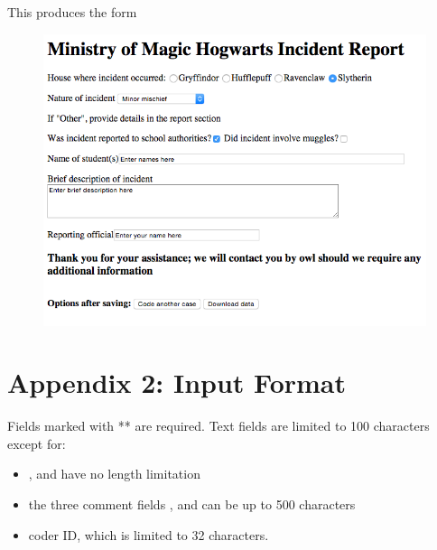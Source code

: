 \documentclass[letterpaper,10pt,english]{sphinxmanual}
\begin{document}
This produces the form
\begin{figure}[htbp]
\centering

\includegraphics{demo_template.png}
\end{figure}


\chapter{Appendix 2: Input Format}
\label{appendix2:appendix-2-input-format}\label{appendix2::doc}
Fields marked with ** are required. Text fields are limited to 100 characters except
for:
\begin{itemize}
\item {} 
,  and  have no length limitation

\item {} 
the three comment fields ,  and  can be up
to 500 characters

\item {} 
coder ID, which is limited to 32 characters.

\end{itemize}
\end{document}
